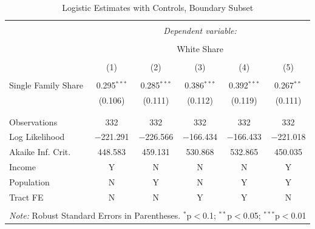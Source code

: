 \documentclass[11pt]{article}
\begin{document}
\begin{table}[!htbp] \centering 
  \caption{Logistic Estimates with Controls, Boundary Subset} 
  \label{tab:logit_controls_causal} 
\begin{tabular}{@{\extracolsep{5pt}}lccccc} 
\\[-1.8ex]\hline 
\hline \\[-1.8ex] 
 & \multicolumn{5}{c}{\textit{Dependent variable:}} \\ 
\cline{2-6} 
\\[-1.8ex] & \multicolumn{5}{c}{White Share} \\ 
\\[-1.8ex] & (1) & (2) & (3) & (4) & (5)\\ 
\hline \\[-1.8ex] 
 Single Family Share & 0.295$^{***}$ & 0.285$^{***}$ & 0.386$^{***}$ & 0.392$^{***}$ & 0.267$^{**}$ \\ 
  & (0.106) & (0.111) & (0.112) & (0.119) & (0.111) \\ 
  & & & & & \\ 
\hline \\[-1.8ex] 
Observations & 332 & 332 & 332 & 332 & 332\\ 
Log Likelihood & $-$221.291 & $-$226.566 & $-$166.434 & $-$166.433 & $-$221.018 \\ 
Akaike Inf. Crit. & 448.583 & 459.131 & 530.868 & 532.865 & 450.035 \\ 
\hline
Income & Y & N & N & N & Y\\
Population & N & Y & N & Y & Y\\
Tract FE & N & N & Y & Y & N\\
\hline 
\hline \\[-1.8ex] 
\multicolumn{6}{l}{\textit{Note:} Robust Standard Errors in Parentheses. $^{*}$p$<$0.1; $^{**}$p$<$0.05; $^{***}$p$<$0.01} \\
\end{tabular} 
\end{table} 
\pagebreak
\end{document}
